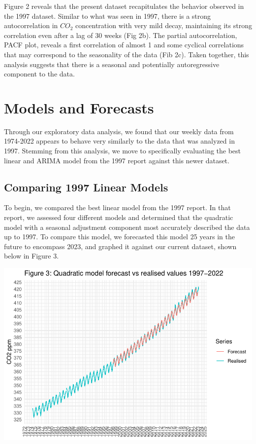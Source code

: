 \documentclass[AER]{AEA}
\begin{document}
Figure 2 reveals that the present dataset recapitulates the behavior
observed in the 1997 dataset. Similar to what was seen in 1997, there is
a strong autocorrelation in \(CO_{2}\) concentration with very mild
decay, maintaining its strong correlation even after a lag of 30 weeks
(Fig 2b). The partial autocorrelation, PACF plot, reveals a first
correlation of almost 1 and some cyclical correlations that may
correspond to the seasonality of the data (Fib 2c). Taken together, this
analysis suggests that there is a seasonal and potentially
autoregressive component to the data.

\hypertarget{models-and-forecasts}{%
\section{Models and Forecasts}\label{models-and-forecasts}}

Through our exploratory data analysis, we found that our weekly data
from 1974-2022 appears to behave very similarly to the data that was
analyzed in 1997. Stemming from this analysis, we move to specifically
evaluating the best linear and ARIMA model from the 1997 report against
this newer dataset.

\hypertarget{comparing-1997-linear-models}{%
\subsection{Comparing 1997 Linear
Models}\label{comparing-1997-linear-models}}

To begin, we compared the best linear model from the 1997 report. In
that report, we assessed four different models and determined that the
quadratic model with a seasonal adjustment component most accurately
described the data up to 1997. To compare this model, we forecasted this
model 25 years in the future to encompass 2023, and graphed it against
our current dataset, shown below in Figure 3.

\includegraphics{co2_present_files/figure-latex/Compare against the realised values QUAD-1.pdf}
\end{document}
